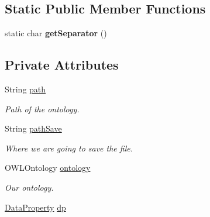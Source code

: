 \subsection*{Static Public Member Functions}
\begin{DoxyCompactItemize}
\item 
\hypertarget{class_ontology_1_1_ontology_adffaab20a43bbfbac43402980e47076a}{
static char {\bfseries getSeparator} ()}
\label{class_ontology_1_1_ontology_adffaab20a43bbfbac43402980e47076a}

\end{DoxyCompactItemize}
\subsection*{Private Attributes}
\begin{DoxyCompactItemize}
\item 
\hypertarget{class_ontology_1_1_ontology_a70b39a7517df023757f3dd3a652cf879}{
String \hyperlink{class_ontology_1_1_ontology_a70b39a7517df023757f3dd3a652cf879}{path}}
\label{class_ontology_1_1_ontology_a70b39a7517df023757f3dd3a652cf879}

\begin{DoxyCompactList}\small\item\em Path of the ontology. \end{DoxyCompactList}\item 
\hypertarget{class_ontology_1_1_ontology_acb67cc36c8a7bc93003a6abc64fff2d2}{
String \hyperlink{class_ontology_1_1_ontology_acb67cc36c8a7bc93003a6abc64fff2d2}{pathSave}}
\label{class_ontology_1_1_ontology_acb67cc36c8a7bc93003a6abc64fff2d2}

\begin{DoxyCompactList}\small\item\em Where we are going to save the file. \end{DoxyCompactList}\item 
\hypertarget{class_ontology_1_1_ontology_a0fe57c961d9d32854e141a7908f513f0}{
OWLOntology \hyperlink{class_ontology_1_1_ontology_a0fe57c961d9d32854e141a7908f513f0}{ontology}}
\label{class_ontology_1_1_ontology_a0fe57c961d9d32854e141a7908f513f0}

\begin{DoxyCompactList}\small\item\em Our ontology. \end{DoxyCompactList}\item 
\hypertarget{class_ontology_1_1_ontology_afdac590abc686bcdddc5e0d28fdf4e03}{
\hyperlink{class_ontology_1_1_data_property}{DataProperty} \hyperlink{class_ontology_1_1_ontology_afdac590abc686bcdddc5e0d28fdf4e03}{dp}}
\label{class_ontology_1_1_ontology_afdac590abc686bcdddc5e0d28fdf4e03}


\end{DoxyCompactItemize}
